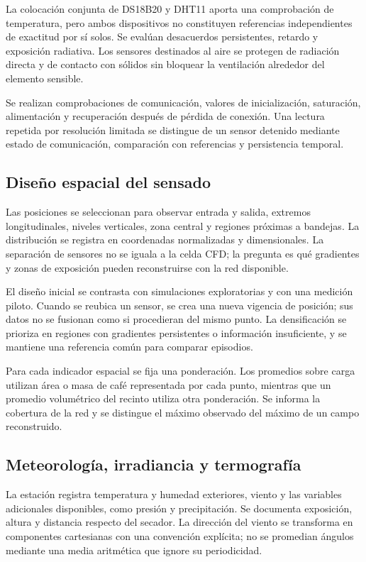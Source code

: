 La colocación conjunta de DS18B20 y DHT11 aporta una comprobación de temperatura, pero ambos dispositivos no constituyen referencias independientes de exactitud por sí solos. Se evalúan desacuerdos persistentes, retardo y exposición radiativa. Los sensores destinados al aire se protegen de radiación directa y de contacto con sólidos sin bloquear la ventilación alrededor del elemento sensible.

Se realizan comprobaciones de comunicación, valores de inicialización, saturación, alimentación y recuperación después de pérdida de conexión. Una lectura repetida por resolución limitada se distingue de un sensor detenido mediante estado de comunicación, comparación con referencias y persistencia temporal.

\subsection{Diseño espacial del sensado}

Las posiciones se seleccionan para observar entrada y salida, extremos longitudinales, niveles verticales, zona central y regiones próximas a bandejas. La distribución se registra en coordenadas normalizadas y dimensionales. La separación de sensores no se iguala a la celda CFD; la pregunta es qué gradientes y zonas de exposición pueden reconstruirse con la red disponible.

El diseño inicial se contrasta con simulaciones exploratorias y con una medición piloto. Cuando se reubica un sensor, se crea una nueva vigencia de posición; sus datos no se fusionan como si procedieran del mismo punto. La densificación se prioriza en regiones con gradientes persistentes o información insuficiente, y se mantiene una referencia común para comparar episodios.

Para cada indicador espacial se fija una ponderación. Los promedios sobre carga utilizan área o masa de café representada por cada punto, mientras que un promedio volumétrico del recinto utiliza otra ponderación. Se informa la cobertura de la red y se distingue el máximo observado del máximo de un campo reconstruido.

\subsection{Meteorología, irradiancia y termografía}

La estación registra temperatura y humedad exteriores, viento y las variables adicionales disponibles, como presión y precipitación. Se documenta exposición, altura y distancia respecto del secador. La dirección del viento se transforma en componentes cartesianas con una convención explícita; no se promedian ángulos mediante una media aritmética que ignore su periodicidad.

